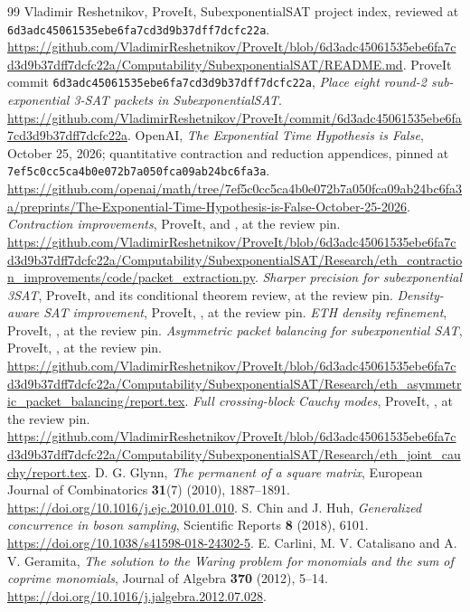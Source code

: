 \documentclass[11pt,letterpaper]{article}
\theoremstyle{definition}\newtheorem{definition}[theorem]{Definition}
\theoremstyle{remark}\newtheorem{remark}[theorem]{Remark}
\newcommand{\pin}{\nolinkurl{6d3adc45061535ebe6fa7cd3d9b37dff7dcfc22a}}
\begin{document}
\begin{thebibliography}{99}
 Vladimir Reshetnikov, ProveIt, SubexponentialSAT project index,
reviewed at \pin.
\url{https://github.com/VladimirReshetnikov/ProveIt/blob/6d3adc45061535ebe6fa7cd3d9b37dff7dcfc22a/Computability/SubexponentialSAT/README.md}.
 ProveIt commit \pin,
\emph{Place eight round-2 sub-exponential 3-SAT packets in SubexponentialSAT}.
\url{https://github.com/VladimirReshetnikov/ProveIt/commit/6d3adc45061535ebe6fa7cd3d9b37dff7dcfc22a}.
 OpenAI, \emph{The Exponential Time Hypothesis is False},
October 25, 2026; quantitative contraction and reduction appendices, pinned at
\nolinkurl{7ef5c0cc5ca4b0e072b7a050fca09ab24bc6fa3a}.
\url{https://github.com/openai/math/tree/7ef5c0cc5ca4b0e072b7a050fca09ab24bc6fa3a/preprints/The-Exponential-Time-Hypothesis-is-False-October-25-2026}.
 \emph{Contraction improvements}, ProveIt,
 and
, at the review pin.
\url{https://github.com/VladimirReshetnikov/ProveIt/blob/6d3adc45061535ebe6fa7cd3d9b37dff7dcfc22a/Computability/SubexponentialSAT/Research/eth_contraction_improvements/code/packet_extraction.py}.
 \emph{Sharper precision for subexponential 3SAT}, ProveIt,
 and its conditional
theorem review, at the review pin.
 \emph{Density-aware SAT improvement}, ProveIt,
,
at the review pin.
 \emph{ETH density refinement}, ProveIt,
, at the review pin.
 \emph{Asymmetric packet balancing for subexponential SAT},
ProveIt, , at the review pin.
\url{https://github.com/VladimirReshetnikov/ProveIt/blob/6d3adc45061535ebe6fa7cd3d9b37dff7dcfc22a/Computability/SubexponentialSAT/Research/eth_asymmetric_packet_balancing/report.tex}.
 \emph{Full crossing-block Cauchy modes}, ProveIt,
, at the review pin.
\url{https://github.com/VladimirReshetnikov/ProveIt/blob/6d3adc45061535ebe6fa7cd3d9b37dff7dcfc22a/Computability/SubexponentialSAT/Research/eth_joint_cauchy/report.tex}.
 D. G. Glynn, \emph{The permanent of a square matrix},
European Journal of Combinatorics \textbf{31}(7) (2010), 1887--1891.
\url{https://doi.org/10.1016/j.ejc.2010.01.010}.
 S. Chin and J. Huh, \emph{Generalized concurrence in boson sampling},
Scientific Reports \textbf{8} (2018), 6101.
\url{https://doi.org/10.1038/s41598-018-24302-5}.
 E. Carlini, M. V. Catalisano and A. V. Geramita,
\emph{The solution to the Waring problem for monomials and the sum of coprime monomials},
Journal of Algebra \textbf{370} (2012), 5--14.
\url{https://doi.org/10.1016/j.jalgebra.2012.07.028}.
\end{thebibliography}
\end{document}
